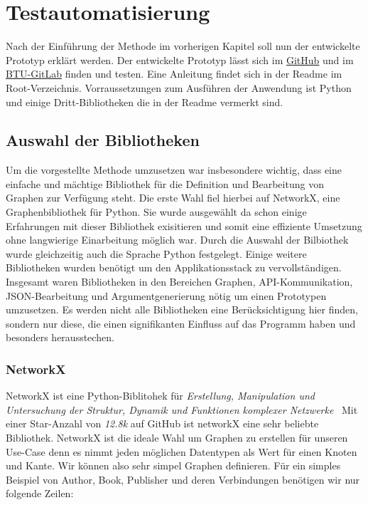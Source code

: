\chapter{Testautomatisierung}
\label{testautomatisierung}

Nach der Einführung der Methode im vorherigen Kapitel soll nun der entwickelte Prototyp erklärt werden.
Der entwickelte Prototyp lässt sich im \href{https://github.com/gernhard1337/graphql-primepath-tester}{GitHub} und im \href{https://git.informatik.tu-cottbus.de/sst/abschlussarbeiten/master/lorenz_tom/graphql-tester-prototyp}{BTU-GitLab} finden und testen.
Eine Anleitung findet sich in der Readme im Root-Verzeichnis.
Vorraussetzungen zum Ausführen der Anwendung ist Python und einige Dritt-Bibliotheken die in der Readme vermerkt sind.

\section{Auswahl der Bibliotheken}

Um die vorgestellte Methode umzusetzen war insbesondere wichtig, dass eine einfache und mächtige Bibliothek für die Definition und Bearbeitung von Graphen zur Verfügung steht.
Die erste Wahl fiel hierbei auf NetworkX, eine Graphenbibliothek für Python.
Sie wurde ausgewählt da schon einige Erfahrungen mit dieser Bibliothek exisitieren und somit eine effiziente Umsetzung ohne langwierige Einarbeitung möglich war.
Durch die Auswahl der Bilbiothek wurde gleichzeitig auch die Sprache Python festgelegt.
Einige weitere Bibliotheken wurden benötigt um den Applikationsstack zu vervollständigen.
Insgesamt waren Bibliotheken in den Bereichen Graphen, API-Kommunikation, JSON-Bearbeitung und Argumentgenerierung nötig um einen Prototypen umzusetzen.
Es werden nicht alle Bibliotheken eine Berücksichtigung hier finden, sondern nur diese, die einen signifikanten Einfluss auf das Programm haben und besonders herausstechen.

\subsection{NetworkX}

NetworkX ist eine Python-Biblitohek für \textit{Erstellung, Manipulation und Untersuchung der Struktur, Dynamik und Funktionen komplexer Netzwerke}~\cite[vgl. Startseite]{networkx}
Mit einer Star-Anzahl von \textit{12.8k}\cite{networkxgithub} auf GitHub ist networkX eine sehr beliebte Bibliothek.
NetworkX ist die ideale Wahl um Graphen zu erstellen für unseren Use-Case denn es nimmt jeden möglichen Datentypen als Wert für einen Knoten und Kante.
Wir können also sehr simpel Graphen definieren.
Für ein simples Beispiel von Author, Book, Publisher und deren Verbindungen benötigen wir nur folgende Zeilen:

